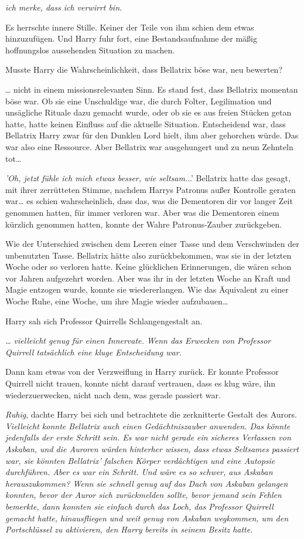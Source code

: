 {\emph{ich merke, dass ich verwirrt bin.}

Es herrschte innere Stille. Keiner der Teile von ihm schien dem etwas hinzuzufügen. Und Harry fuhr fort, eine Bestandsaufnahme der mäßig hoffnungslos aussehenden Situation zu machen.

Musste Harry die Wahrscheinlichkeit, dass Bellatrix böse war, neu bewerten?

… nicht in einem missionsrelevanten Sinn. Es stand fest, dass Bellatrix momentan böse war. Ob sie eine Unschuldige war, die durch Folter, Legilimation und unsägliche Rituale dazu gemacht wurde, oder ob sie es aus freien Stücken getan hatte, hatte keinen Einfluss auf die aktuelle Situation. Entscheidend war, dass Bellatrix Harry zwar für den Dunklen Lord hielt, ihm aber gehorchen würde. Das war also eine Ressource. Aber Bellatrix war ausgehungert und zu neun Zehnteln tot…

\emph{'Oh, jetzt fühle ich mich etwas besser, wie seltsam.}..' Bellatrix hatte das gesagt, mit ihrer zerrütteten Stimme, nachdem Harrys Patronus außer Kontrolle geraten war… es schien wahrscheinlich, dass das, was die Dementoren dir vor langer Zeit genommen hatten, für immer verloren war. Aber was die Dementoren einem kürzlich genommen hatten, konnte der Wahre Patronus-Zauber zurückgeben.

Wie der Unterschied zwischen dem Leeren einer Tasse und dem Verschwinden der unbenutzten Tasse. Bellatrix hätte also zurückbekommen, was sie in der letzten Woche oder so verloren hatte. Keine glücklichen Erinnerungen, die wären schon vor Jahren aufgezehrt worden. Aber was ihr in der letzten Woche an Kraft und Magie entzogen wurde, konnte sie wiedererlangen. Wie das Äquivalent zu einer Woche Ruhe, eine Woche, um ihre Magie wieder aufzubauen…

Harry sah sich Professor Quirrells Schlangengestalt an.

\emph{… vielleicht genug für einen Innervate. Wenn das Erwecken von Professor Quirrell tatsächlich eine kluge Entscheidung war.}

Dann kam etwas von der Verzweiflung in Harry zurück. Er konnte Professor Quirrell nicht trauen, konnte nicht darauf vertrauen, dass es klug wäre, ihn wiederzuerwecken, nicht nach dem, was gerade passiert war.

\emph{Ruhig}, dachte Harry bei sich und betrachtete die zerknitterte Gestalt des Aurors. \emph{Vielleicht konnte Bellatrix auch einen Gedächtniszauber anwenden. Das könnte jedenfalls der erste Schritt sein. Es war nicht gerade ein sicheres Verlassen von Askaban, und die Auroren würden hinterher wissen, dass etwas Seltsames passiert war, sie könnten Bellatrix' falschen Körper verdächtigen und eine Autopsie durchführen. Aber es war ein Schritt. Und wäre es so schwer, aus Askaban herauszukommen? Wenn sie schnell genug auf das Dach von Askaban gelangen konnten, bevor der Auror sich zurückmelden sollte, bevor jemand sein Fehlen bemerkte, dann konnten sie einfach durch das Loch, das Professor Quirrell gemacht hatte, hinausfliegen und weit genug von Askaban wegkommen, um den Portschlüssel zu aktivieren, den Harry bereits in seinem Besitz hatte.}

}
